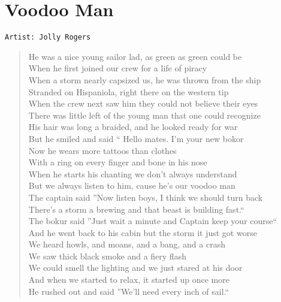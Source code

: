 \documentclass[11pt]{article}
\begin{document}
\section{Voodoo Man}
\label{sec:org0686abc}
\begin{verbatim}
Artist: Jolly Rogers
\end{verbatim}
\begin{verse}
He was a nice young sailor lad, as green as green could be\\
When he first joined our crew for a life of piracy\\
When a storm nearly capsized us, he was thrown from the ship\\
Stranded on Hispaniola, right there on the western tip\\
When the crew next saw him they could not believe their eyes\\
There was little left of the young man that one could recognize\\
His hair was long a braided, and he looked ready for war\\
But he smiled and said `` Hello mates. I'm your new bokor\\
\vspace*{1em}
Now he wears more tattoos than clothes\\
With a ring on every finger and bone in his nose\\
When he starts his chanting we don't always understand\\
But we always listen to him, cause he's our voodoo man\\
The captain said ''Now listen boys, I think we should turn back\\
There's a storm a brewing and that beast is building fast.``\\
The bokur said ''Just wait a minute and Captain keep your course``\\
And he went back to his cabin but the storm it just got worse\\
\vspace*{1em}
We heard howls, and moans, and a bang, and a crash\\
We saw thick black smoke and a fiery flash\\
We could smell the lighting and we just stared at his door\\
And when we started to relax, it started up once more\\
\vspace*{1em}
He rushed out and said ''We'll need every inch of sail.``\\

\end{verse}
\end{document}
